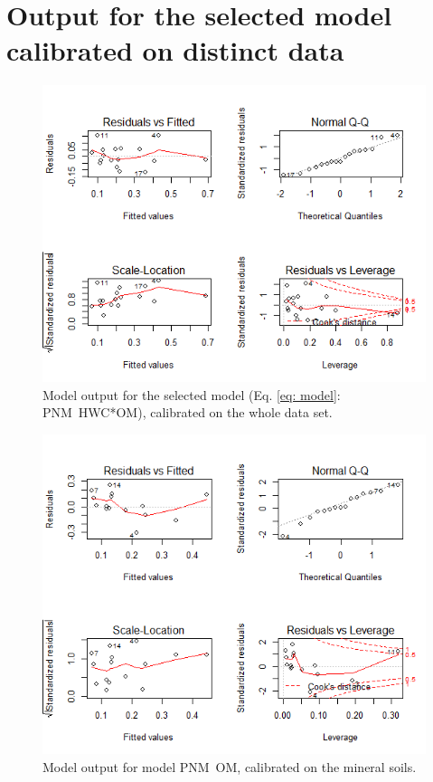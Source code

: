 \documentclass[10pt,twoside,dutch,english]{report}
\begin{document}
\begin{appendices}
\begin{table}[H]
\begin{tabu}
		\end{tabu}
		\label{tab: results_mods}
	\end{table}
    
    
\section{Output for the selected model calibrated on distinct data}
\label{chap: modplots}
	\begin{figure}[H] %
    	\centering
		\includegraphics[width=0.6\linewidth]{app_modout_all}
		\caption{Model output for the selected model (Eq. \ref{eq: model}: PNM~HWC*OM), calibrated on the whole data set.}
		\end{figure}
		\begin{figure}[H] %
    	\centering
		\includegraphics[width=0.65\linewidth]{app_modout_minOS}
		\caption{Model output for model  PNM~OM, calibrated on the mineral soils.}
		\end{figure}
		\begin{figure}[H] %
    	\centering

\end{figure}
\end{appendices}
\end{document}
